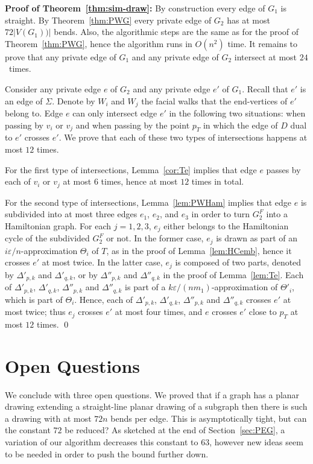 \documentclass{llncs}
\newenvironment{proofof}[1]{\par\addvspace\topsep\noindent
{\bf Proof #1:} \ignorespaces }{\qed}
\begin{document}
\begin{proofof}{of Theorem~\ref{thm:sim-draw}}
By construction every edge of $G_1$ is straight. By Theorem~\ref{thm:PWG} every private edge of $G_2$ has at most $72 |V(G_1))|$ bends. Also, the algorithmic steps are the same as for the proof of Theorem~\ref{thm:PWG}, hence the algorithm runs in $O(n^2)$ time. It remains to prove that any private edge of $G_1$ and any private edge of $G_2$ intersect at most $24$~times.

Consider any private edge $e$ of $G_2$ and any private edge $e'$ of $G_1$. Recall that $e'$ is an edge of $\Sigma$. Denote by $W_i$ and $W_j$ the facial walks that the end-vertices of $e'$ belong to.
Edge $e$ can only intersect edge $e'$ in the following two situations:
when passing by $v_i$ or $v_j$ and when passing by the point $p_T$ in which the edge of $D$ dual to $e'$ crosses $e'$. We prove that each of these two types of intersections happens at most $12$ times.

For the first type of intersections, Lemma~\ref{cor:Te} implies that edge $e$ passes by each of $v_i$ or $v_j$ at most $6$ times, hence at most $12$ times in total.

For the second type of intersections, Lemma~\ref{lem:PWHam} implies that edge $e$ is subdivided into at most three edges $e_1$, $e_2$, and $e_3$ in order to turn $G^F_2$ into a Hamiltonian graph. For each $j=1,2,3$, $e_j$ either belongs to the Hamiltonian cycle of the subdivided $G^F_2$ or not. In the former case, $e_j$ is drawn as part of an $i \varepsilon/n$-approximation $\Theta_i$ of $T$, as in the proof of Lemma~\ref{lem:HCemb}, hence it crosses $e'$ at most twice. In the latter case, $e_j$ is composed of two parts, denoted by $\Delta'_{p,k}$ and $\Delta'_{q,k}$, or by $\Delta''_{p,k}$ and $\Delta''_{q,k}$ in the proof of Lemma~\ref{lem:Te}. Each of $\Delta'_{p,k}$, $\Delta'_{q,k}$, $\Delta''_{p,k}$ and $\Delta''_{q,k}$ is part of a $k\varepsilon/(nm_1)$-approximation of $\Theta'_i$, which is part of $\Theta_i$. Hence, each of $\Delta'_{p,k}$, $\Delta'_{q,k}$, $\Delta''_{p,k}$ and $\Delta''_{q,k}$ crosses $e'$ at most twice; thus $e_j$ crosses $e'$ at most four times, and $e$ crosses $e'$ close to $p_T$ at most $12$ times.
\end{proofof}


\section{Open Questions}

We conclude with three open questions.
We proved that if a graph has a planar drawing extending a straight-line planar drawing of a subgraph then there is such a drawing with at most $72n$ bends per edge.  This is asymptotically tight, but can the constant $72$ be reduced? As sketched at the end of Section~\ref{sec:PEG}, a variation of our algorithm decreases this constant to $63$, however new ideas seem to be needed in order to push the bound further down.
\end{document}
